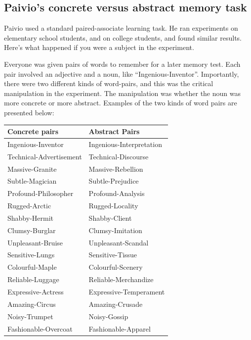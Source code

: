 \documentclass[
  oneside,
  12pt]{crumpbook}
\begin{document}
\hypertarget{paivios-concrete-versus-abstract-memory-task}{%
\subsection{Paivio's concrete versus abstract memory task}\label{paivios-concrete-versus-abstract-memory-task}}

Paivio used a standard paired-associate learning task. He ran experiments on elementary school students, and on college students, and found similar results. Here's what happened if you were a subject in the experiment.

Everyone was given pairs of words to remember for a later memory test. Each pair involved an adjective and a noun, like ``Ingenious-Inventor''. Importantly, there were two different kinds of word-pairs, and this was the critical manipulation in the experiment. The manipulation was whether the noun was more concrete or more abstract. Examples of the two kinds of word pairs are presented below:

\begin{longtable}[]{@{}ll@{}}
\toprule
Concrete pairs & Abstract Pairs \\
\midrule
\endhead
Ingenious-Inventor & Ingenious-Interpretation \\
Technical-Advertisement & Technical-Discourse \\
Massive-Granite & Massive-Rebellion \\
Subtle-Magician & Subtle-Prejudice \\
Profound-Philosopher & Profound-Analysis \\
Rugged-Arctic & Rugged-Locality \\
Shabby-Hermit & Shabby-Client \\
Clumsy-Burglar & Clumsy-Imitation \\
Unpleasant-Bruise & Unpleasant-Scandal \\
Sensitive-Lungs & Sensitive-Tissue \\
Colourful-Maple & Colourful-Scenery \\
Reliable-Luggage & Reliable-Merchandize \\
Expressive-Actress & Expressive-Temperament \\
Amazing-Circus & Amazing-Crusade \\
Noisy-Trumpet & Noisy-Gossip \\
Fashionable-Overcoat & Fashionable-Apparel \\
\bottomrule
\end{longtable}
\end{document}

